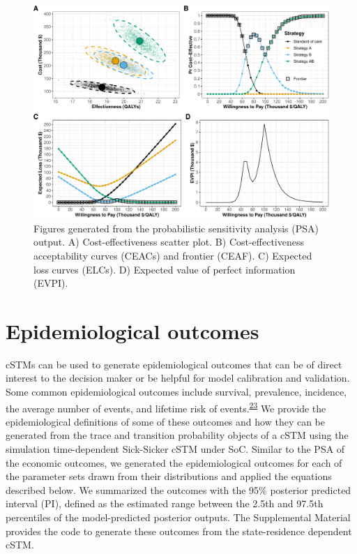 \documentclass[
]{article}
\begin{document}
\begin{figure}[H]

{\centering \includegraphics{figs/PSA-figures-1} 

}

\caption{Figures generated from the probabilistic sensitivity analysis (PSA) output. A) Cost-effectiveness scatter plot. B) Cost-effectiveness acceptability curves (CEACs) and frontier (CEAF). C) Expected loss curves (ELCs). D) Expected value of perfect information (EVPI).}\label{fig:PSA-figures}
\end{figure}

\hypertarget{epidemiological-outcomes}{%
\section{Epidemiological outcomes}\label{epidemiological-outcomes}}

cSTMs can be used to generate epidemiological outcomes that can be of direct interest to the decision maker or be helpful for model calibration and validation. Some common epidemiological outcomes include survival, prevalence, incidence, the average number of events, and lifetime risk of events.\textsuperscript{\protect\hyperlink{ref-Siebert2012c}{23}} We provide the epidemiological definitions of some of these outcomes and how they can be generated from the trace and transition probability objects of a cSTM using the simulation time-dependent Sick-Sicker cSTM under SoC. Similar to the PSA of the economic outcomes, we generated the epidemiological outcomes for each of the parameter sets drawn from their distributions and applied the equations described below. We summarized the outcomes with the 95\% posterior predicted interval (PI), defined as the estimated range between the 2.5th and 97.5th percentiles of the model-predicted posterior outputs. The Supplemental Material provides the code to generate these outcomes from the state-residence dependent cSTM.
\end{document}
